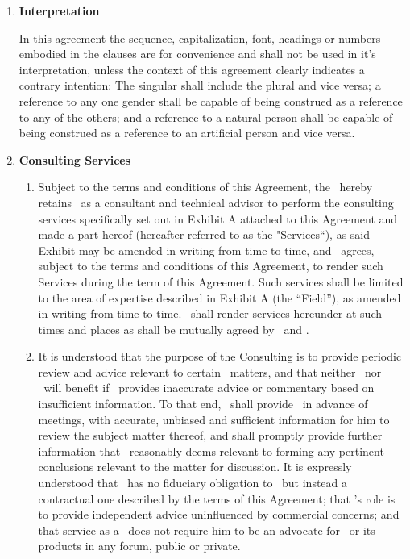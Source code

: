 \documentclass[a4paper,10pt,notitlepage,twocolumn]{article}
\begin{document}
\begin{enumerate} 
\item \textbf{ Interpretation}

In this agreement the sequence, capitalization, font, headings or numbers embodied in the clauses are for convenience and shall not be used in it's interpretation, unless the context of this agreement clearly indicates a contrary intention: The singular shall include the plural and vice versa; a reference to any one gender shall be capable of being construed as a reference to any of the others; and a reference to a natural person shall be capable of being construed as a reference to an artificial person and vice versa.



\item \textbf{Consulting Services}
\begin{enumerate}

\item 	Subject to the terms and conditions of this Agreement, the \clref\ hereby retains \cntrref\ as a consultant and technical advisor to perform the consulting services specifically set out in Exhibit A attached to this Agreement and made a part hereof (hereafter referred to as the "Services``), as said Exhibit may be amended in writing from time to time, and \cntrref\ agrees, subject to the terms and conditions of this Agreement, to render such Services during the term of this Agreement.  Such services shall be limited to the area of expertise described in Exhibit A (the ``Field''), as amended in writing from time to time.  \cntrref\ shall render services hereunder at such times and places as shall be mutually agreed by \clref\ and \cntrref . 

\item  It is understood that the purpose of the Consulting is to provide periodic review and advice relevant to certain \clref\ matters, and that neither \cntrref\ nor \clref\ will benefit if \cntrref\ provides inaccurate advice or commentary based on insufficient information.  To that end, \clref\ shall provide \cntrref\, in advance of meetings, with accurate, unbiased and sufficient information for him to review the subject matter thereof, and shall promptly provide further information that \cntrref\ reasonably deems relevant to forming any pertinent conclusions relevant to the matter for discussion.  It is expressly understood that \cntrref\ has no fiduciary obligation to \clref\, but instead a contractual one described by the terms of this Agreement; that \cntrref 's role is to provide independent advice uninfluenced by commercial concerns; and that service as a \cntrref\ does not require him to be an advocate for \clref\ or its products in any forum, public or private. 
\end{enumerate}


\end{enumerate}
\end{document}
